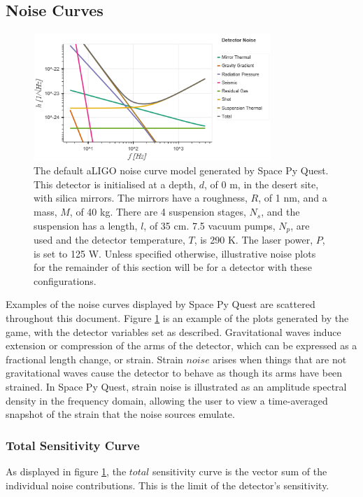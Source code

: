 \documentclass{article}
\begin{document}
\subsection{Noise Curves}
\begin{figure}
\centering
\includegraphics[width=0.8\textwidth]{SPQ_aLIGO.png}
\caption{The default aLIGO noise curve model generated by Space Py
  Quest. This detector is initialised at a depth, $d$, of 0 m, in the
  desert site, with silica mirrors. The mirrors have a roughness, $R$,
  of 1 nm, and a mass, $M$, of 40 kg. There are 4 suspension stages,
  $N_s$, and the suspension has a length, $l$, of 35 cm. 7.5 vacuum
  pumps, $N_p$, are used and the detector temperature, $T$, is 290
  K. The laser power, $P$, is set to 125 W. Unless specified
  otherwise, illustrative noise plots for the remainder of this
  section will be for a detector with these configurations.}
\label{fig:aLIGO}
\end{figure}
Examples of the noise curves displayed by Space Py Quest are scattered
throughout this document. Figure \ref{fig:aLIGO} is an example of the
plots generated by the game, with the detector variables set as
described. Gravitational waves induce extension or compression of the
arms of the detector, which can be expressed as a fractional length
change, or strain. Strain $noise$ arises when things that are not
gravitational waves cause the detector to behave as though its arms
have been strained. In Space Py Quest, strain noise is illustrated as
an amplitude spectral density in the frequency domain, allowing the
user to view a time-averaged snapshot of the strain that the noise
sources emulate.

\subsubsection{Total Sensitivity Curve}
As displayed in figure \ref{fig:aLIGO}, the $total$ sensitivity curve
is the vector sum of the individual noise contributions. This is the
limit of the detector's sensitivity.
\end{document}
